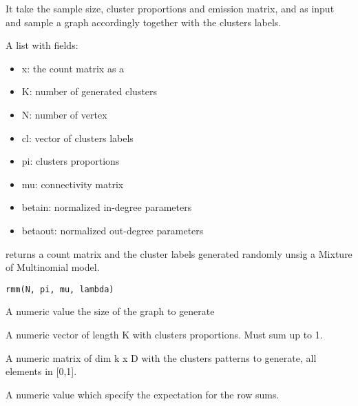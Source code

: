\documentclass[letterpaper]{book}
\begin{document}
%
\begin{Details}\relax
It take the sample size, cluster proportions and emission matrix, and  as input and sample a graph accordingly together with the clusters labels.
\end{Details}
%
\begin{Value}
A list with fields:
\begin{itemize}

\item x: the count matrix as a 
\item K: number of generated clusters
\item N: number of vertex
\item cl: vector of clusters labels
\item pi: clusters proportions
\item mu: connectivity matrix
\item betain: normalized in-degree parameters 
\item betaout: normalized out-degree parameters

\end{itemize}

\end{Value}
%
\begin{Description}\relax
{} returns a count matrix and the cluster labels generated randomly unsig a Mixture of Multinomial model.
\end{Description}
%
\begin{Usage}
\begin{verbatim}
rmm(N, pi, mu, lambda)
\end{verbatim}
\end{Usage}
%
\begin{Arguments}
\begin{ldescription}
\item[\code{N}] A numeric value the size of the graph to generate

\item[\code{pi}] A numeric vector of length K with clusters proportions. Must sum up to 1.

\item[\code{mu}] A numeric matrix of dim k x D with the clusters patterns to generate, all elements in [0,1].

\item[\code{lambda}] A numeric value which specify the expectation for the row sums.
\end{ldescription}
\end{Arguments}
\end{document}
